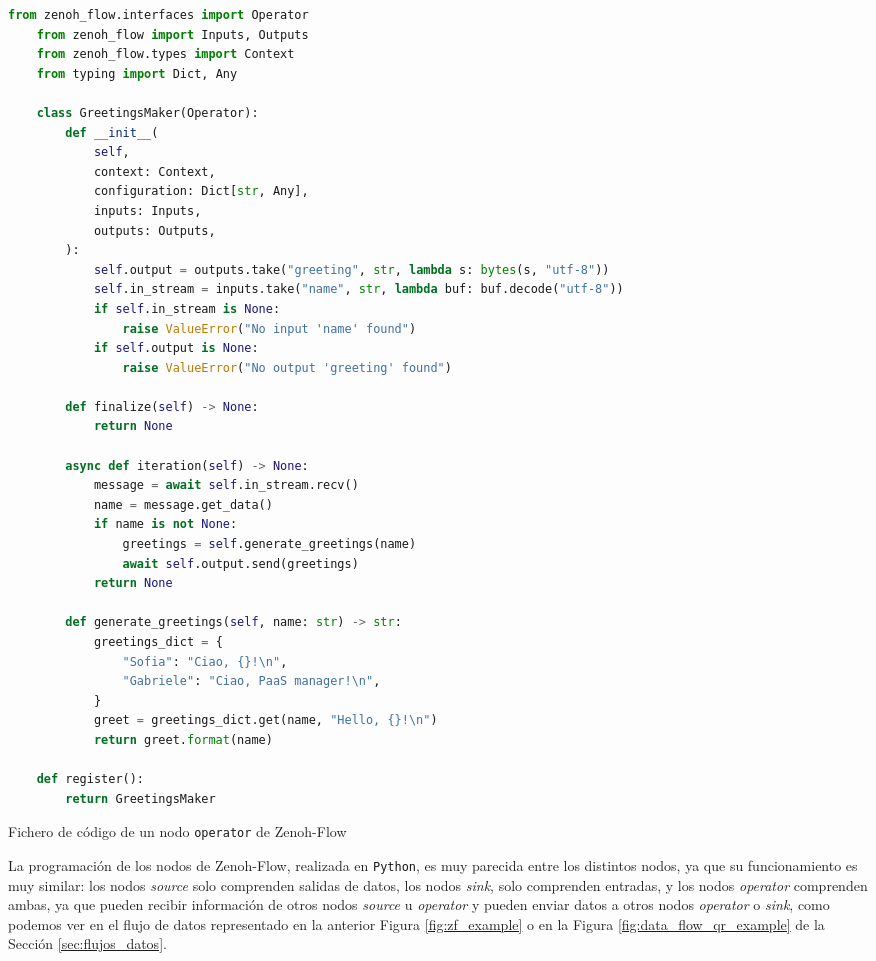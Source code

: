 \begin{code}[H]
  \begin{lstlisting}[language=Python]
    from zenoh_flow.interfaces import Operator
    from zenoh_flow import Inputs, Outputs
    from zenoh_flow.types import Context
    from typing import Dict, Any
    
    class GreetingsMaker(Operator):
        def __init__(
            self,
            context: Context,
            configuration: Dict[str, Any],
            inputs: Inputs,
            outputs: Outputs,
        ):
            self.output = outputs.take("greeting", str, lambda s: bytes(s, "utf-8"))
            self.in_stream = inputs.take("name", str, lambda buf: buf.decode("utf-8"))
            if self.in_stream is None:
                raise ValueError("No input 'name' found")
            if self.output is None:
                raise ValueError("No output 'greeting' found")
    
        def finalize(self) -> None:
            return None
    
        async def iteration(self) -> None:
            message = await self.in_stream.recv()
            name = message.get_data()
            if name is not None:
                greetings = self.generate_greetings(name)
                await self.output.send(greetings)
            return None
    
        def generate_greetings(self, name: str) -> str:
            greetings_dict = {
                "Sofia": "Ciao, {}!\n",
                "Gabriele": "Ciao, PaaS manager!\n",
            }
            greet = greetings_dict.get(name, "Hello, {}!\n")
            return greet.format(name)
    
    def register():
        return GreetingsMaker
  \end{lstlisting}
\caption[Fichero de código de un nodo \texttt{operator} en Zenoh-Flow]{Fichero de código de un nodo \texttt{operator} de Zenoh-Flow}
\label{cod:operator_node}
\end{code}

La programación de los nodos de Zenoh-Flow, realizada en \texttt{Python}, es muy
parecida entre los distintos nodos, ya que su funcionamiento es muy similar: los
nodos \textit{source} solo comprenden salidas de datos, los nodos \textit{sink},
solo comprenden entradas, y los nodos \textit{operator} comprenden ambas, ya que
pueden recibir información de otros nodos \textit{source} u \textit{operator} y
pueden enviar datos a otros nodos \textit{operator} o \textit{sink}, como
podemos ver en el flujo de datos representado en la anterior Figura
\ref{fig:zf_example} o en la Figura \ref{fig:data_flow_qr_example} de la Sección
\ref{sec:flujos_datos}.
\\

